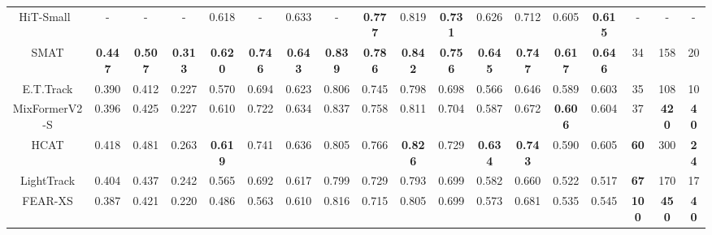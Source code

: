 \begin{table}[th!]
{\begin{tabular}{c |c c  c  |c c  |c c |c c  c |c c |c c |c c c}
	HiT-Small~\cite{kang2023exploring} %
	 & - & - & - &  0.618 & - & 0.633 & - & \color{ForestGreen} \bf{0.777} & 0.819 & \color{ForestGreen} \bf{0.731} & 0.626 & 0.712 & 0.605 & \color{ForestGreen} \bf{0.615} & - & - & -\\
	SMAT \cite{gopal2024separable} & \color{ForestGreen} \bf{0.447} & \color{ForestGreen} \bf{0.507} & \color{ForestGreen} \bf{0.313}  &  \color{RoyalBlue} \bf{0.620}  &  \color{RoyalBlue} \bf{0.746} & \color{ForestGreen} \bf{0.643}  & \color{ForestGreen} \bf{0.839}  &  \color{Mahogany} \bf{0.786} &  \color{Mahogany} \bf{0.842}  &  \color{Mahogany} \bf{0.756} &  \color{RoyalBlue} \bf{0.645}  &  \color{RoyalBlue} \bf{0.747} &  \color{Mahogany} \bf{0.617}  &  \color{Mahogany} \bf{0.646}  & 34 & 158 & 20 \\
	E.T.Track \cite{blatter2023efficient} & 0.390 & 0.412 & 0.227               & 0.570  & 0.694 & 0.623  & 0.806 & 0.745  & 0.798  & 0.698 & 0.566  & 0.646 & 0.589  & 0.603 & 35 & 108 & 10 \\
	MixFormerV2-S \cite{cui2024mixformerv2} & 0.396 & 0.425 & 0.227             & 0.610  & 0.722 & 0.634  & 0.837 & 0.758  & 0.811  & 0.704 & 0.587  & 0.672 & \color{ForestGreen} \bf{0.606}  & 0.604  & 37 & \color{ForestGreen} \bf{420} & \color{Mahogany} \bf{40} \\
	HCAT \cite{chen2022efficient} & 0.418 & 0.481 & 0.263                       & \color{ForestGreen} \bf{0.619}  & 0.741 & 0.636  & 0.805 & 0.766  & \color{ForestGreen} \bf{0.826}  & 0.729 & \color{ForestGreen} \bf{0.634}  & \color{ForestGreen} \bf{0.743} & 0.590  & 0.605 & \color{ForestGreen} \bf{60} & 300 & \color{ForestGreen} \bf{24} \\
	LightTrack \cite{yan2021lighttrack} & 0.404 & 0.437 & 0.242                 & 0.565  & 0.692 & 0.617  & 0.799 & 0.729  & 0.793  & 0.699 & 0.582  & 0.660  & 0.522  & 0.517 & \color{RoyalBlue} \bf{67} & 170 & 17 \\
	FEAR-XS \cite{borsuk2022fear} & 0.387 & 0.421 & 0.220                       & 0.486  & 0.563 & 0.610  & 0.816 & 0.715  & 0.805 & 0.699 & 0.573  & 0.681  & 0.535  & 0.545 &  \color{Mahogany} \bf{100} & \color{Mahogany} \bf{450} & \color{Mahogany} \bf{40}\\
  

\end{tabular}}
\end{table}
